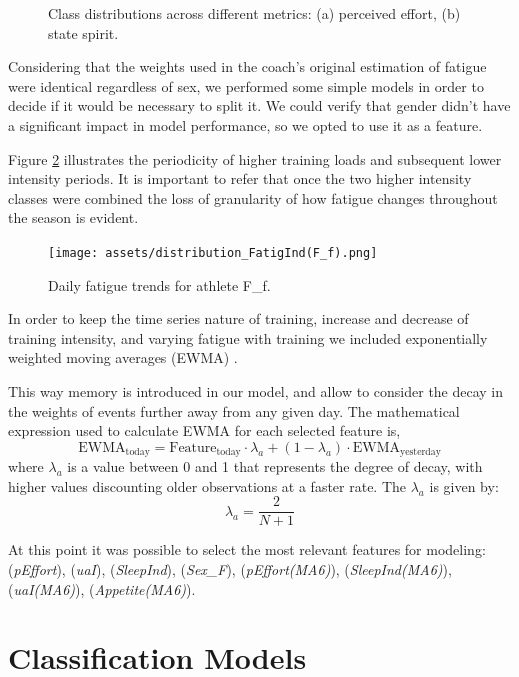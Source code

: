 \documentclass[conference]{IEEEtran}
\begin{document}
\begin{figure}[H]
    \caption{Class distributions across different metrics: (a) perceived effort, (b) state spirit.}
    \label{classdist_feat}
\end{figure}

Considering that the weights used in the coach's original estimation of fatigue were identical regardless of sex, we performed some simple models in order to decide if it would be necessary to split it. We could verify that gender didn't have a significant impact in model performance, so we opted to use it as a feature. 

Figure \ref{fatig_Ff} illustrates the periodicity of higher training loads and subsequent lower intensity periods. It is important to refer that once the two higher intensity classes were combined the loss of granularity of how fatigue changes throughout the season is evident.  
\begin{figure}[H]
    \centering
    \texttt{[image: assets/distribution\_FatigInd(F\_f).png]}
    \caption{Daily fatigue trends for athlete F\_f.}
    \label{fatig_Ff}
\end{figure}

In order to keep the time series nature of training, increase and decrease of training intensity, and varying fatigue with training we included exponentially weighted moving averages (EWMA) \cite{Williams17}.

This way memory is introduced in our model, and allow to consider the decay in the weights of events further away from any given day. The mathematical expression used to calculate EWMA for each selected feature is,
\begin{equation*}
    \text{EWMA}_{\text{today}} = \text{Feature}_{\text{today}} \cdot \lambda_a + (1 - \lambda_a) \cdot \text{EWMA}_{\text{yesterday}}
\end{equation*}
where $\lambda_a$ is a value between 0 and 1 that represents the degree of decay, with higher values discounting older observations at a faster rate. The $\lambda_a$ is given by:
\begin{equation*}
    \lambda_a = \frac{2}{N + 1}
\end{equation*} 

At this point it was possible to select the most relevant features for modeling: (\textit{pEffort}), (\textit{uaI}), (\textit{SleepInd}), (\textit{Sex\_F}), (\textit{pEffort(MA6)}), (\textit{SleepInd(MA6)}), (\textit{uaI(MA6)}), (\textit{Appetite(MA6)}).

\section{Classification Models}
\end{document}
